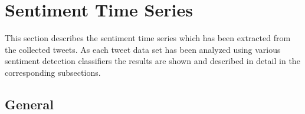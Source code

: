 

\section{Sentiment Time Series}
\label{s:analysis-sentiments}

This section describes the sentiment time series which has been extracted from the collected tweets.
As each tweet data set has been analyzed using various sentiment detection classifiers the results are shown and described in detail in the corresponding subsections.

\subsection{General}
\label{ss:analysis-sentiments-general}

